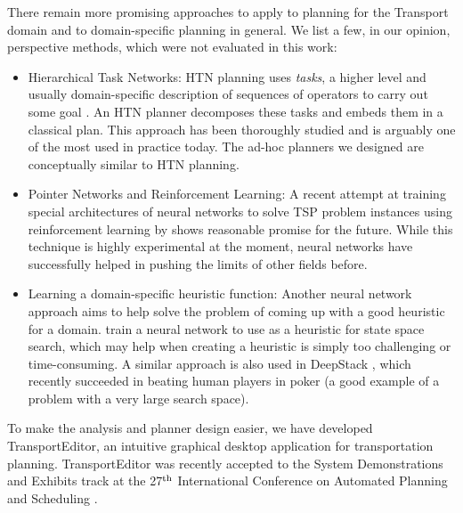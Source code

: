There remain more promising approaches to apply to planning
for the Transport domain
and to domain-specific planning in general.
We list a few, in our opinion, perspective methods, which were not
evaluated in this work:
\begin{itemize}
\item Hierarchical Task Networks: 
HTN planning uses \textit{tasks},
a higher level and usually domain-specific description of sequences of operators
to carry out some goal \citep[Chapter~11]{Ghallab2004}.
An HTN planner decomposes these tasks and embeds them in a classical plan. This approach has been thoroughly studied and is arguably one of the most used in practice today. The ad-hoc planners we designed are conceptually similar to HTN planning.

\item Pointer Networks and Reinforcement Learning: 
A recent attempt at training special architectures of neural networks to solve TSP problem instances using reinforcement learning by \citet{Bello2016} shows
reasonable promise for the future. While this technique is highly experimental at the moment,
neural networks have successfully helped in pushing the limits of other fields before.

\item Learning a domain-specific heuristic function: Another neural network
approach aims to help solve the problem of coming up with a good heuristic for a domain. \citet{Chen2011}
train a neural network to use as a heuristic for state space search,
which may help when creating a heuristic is simply too challenging or time-consuming.
A similar approach is also used in DeepStack \citep{Moravcik2017}, which recently succeeded in
beating human players in poker (a good example of a problem with a very large search space).
\end{itemize}

To make the analysis and planner design easier, we have developed TransportEditor,
an intuitive graphical desktop application for transportation planning.
TransportEditor was recently accepted to the System Demonstrations and Exhibits
track at the 27$^{\textrm{th}}$ International Conference on Automated Planning and Scheduling \citep{Skopek2017}. 
